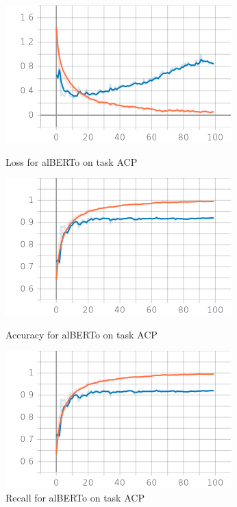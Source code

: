 \documentclass{article}
\begin{document}
            \begin{figure}[!htb]
                \begin{minipage}{0.48\textwidth}
                    \centering
                    \includegraphics[width=.7\linewidth]{alberto_acp_epoch_loss.png}
                    \caption{Loss for alBERTo on task ACP}\label{Fig:Data4}
                \end{minipage}\hfill
                \begin{minipage}{0.48\textwidth}
                    \centering
                    \includegraphics[width=.7\linewidth]{alberto_acp_epoch_accuracy.png}
                    \caption{Accuracy for alBERTo on task ACP}\label{Fig:Data5}
                \end{minipage}
                \begin{minipage}{0.48\textwidth}
                    \centering
                    \includegraphics[width=.7\linewidth]{alberto_acp_epoch_recall.png}
                    \caption{Recall for alBERTo on task ACP}\label{Fig:Data6}
                \end{minipage}
            \end{figure}
\end{document}
